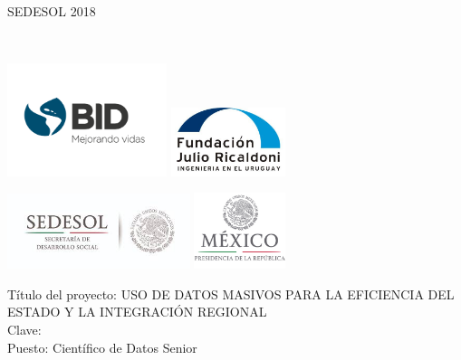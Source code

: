 \begin{center}
SEDESOL 2018
\vspace{0.1cm}

  \begin{center}



      \Large \MyName \\\vspace{5mm}
\begin{multicols}{2}
\includegraphics[width=0.35\textwidth]{images/bid}
\includegraphics[width=0.25\textwidth]{images/LOGO_FJR}
\end{multicols}
\begin{multicols}{2}
\includegraphics[width=0.4\textwidth]{images/sedesol}
\includegraphics[width=0.2\textwidth]{images/presidencia}
\end{multicols}


  \vspace{2mm}

  \end{center}
  \vspace{0.3cm}
  {\Large Título del proyecto: USO DE DATOS MASIVOS PARA LA EFICIENCIA DEL ESTADO Y LA INTEGRACIÓN REGIONAL\\}
    {\large Clave: \Contrato}\\
  \vspace{0.5cm}
  \Large Puesto: Científico de Datos Senior\\
  \vspace{1.0cm}


\end{center}
